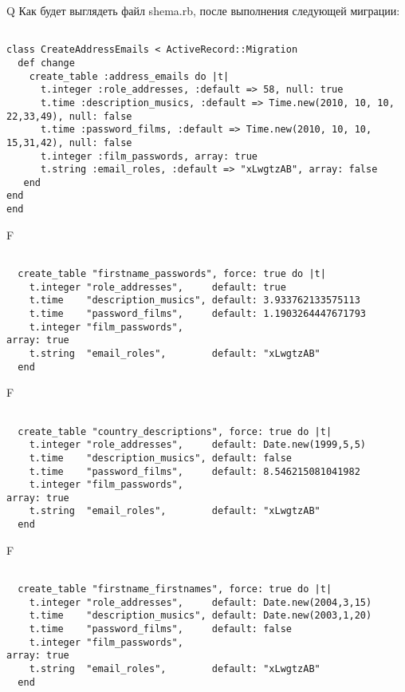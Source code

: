 Q
Как будет выглядеть файл shema.rb, после выполнения следующей миграции:

\begin{verbatim}

class CreateAddressEmails < ActiveRecord::Migration 
  def change 
    create_table :address_emails do |t| 
      t.integer :role_addresses, :default => 58, null: true
      t.time :description_musics, :default => Time.new(2010, 10, 10, 22,33,49), null: false
      t.time :password_films, :default => Time.new(2010, 10, 10, 15,31,42), null: false
      t.integer :film_passwords, array: true
      t.string :email_roles, :default => "xLwgtzAB", array: false
   end
end
end
\end{verbatim}

F
\begin{verbatim}

  create_table "firstname_passwords", force: true do |t|
    t.integer "role_addresses",     default: true
    t.time    "description_musics", default: 3.933762133575113
    t.time    "password_films",     default: 1.1903264447671793
    t.integer "film_passwords",                                                  array: true
    t.string  "email_roles",        default: "xLwgtzAB"
  end

\end{verbatim}

F
\begin{verbatim}

  create_table "country_descriptions", force: true do |t|
    t.integer "role_addresses",     default: Date.new(1999,5,5)
    t.time    "description_musics", default: false
    t.time    "password_films",     default: 8.546215081041982
    t.integer "film_passwords",                                                  array: true
    t.string  "email_roles",        default: "xLwgtzAB"
  end

\end{verbatim}

F
\begin{verbatim}

  create_table "firstname_firstnames", force: true do |t|
    t.integer "role_addresses",     default: Date.new(2004,3,15)
    t.time    "description_musics", default: Date.new(2003,1,20)
    t.time    "password_films",     default: false
    t.integer "film_passwords",                                                  array: true
    t.string  "email_roles",        default: "xLwgtzAB"
  end

\end{verbatim}

